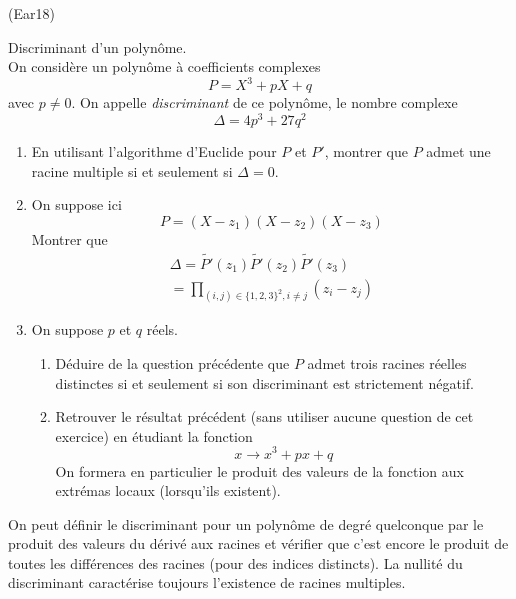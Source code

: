 \begin{tiny}(Ear18)\end{tiny} Discriminant d'un polynôme.\\
On considère un polynôme à coefficients complexes
\begin{displaymath}
 P = X^3 +pX+q
\end{displaymath}
avec $p\neq 0$. On appelle \emph{discriminant} de ce polynôme, le nombre complexe
\begin{displaymath}
 \Delta = 4p^3 + 27q^2
\end{displaymath}
\begin{enumerate}
 \item En utilisant l'algorithme d'Euclide pour $P$ et $P'$, montrer que $P$ admet une racine multiple si et seulement si $\Delta =0$.
 \item On suppose ici
\begin{displaymath}
 P = (X-z_1)(X-z_2)(X-z_3)
\end{displaymath}
 Montrer que
\begin{multline*}
 \Delta = \widetilde{P'}(z_1)\widetilde{P'}(z_2)\widetilde{P'}(z_3)\\
 = \prod_{(i,j)\in\{1,2,3\}^2,i\neq j} (z_i-z_j)
\end{multline*}
\item On suppose $p$ et $q$ réels.
\begin{enumerate}
 \item Déduire de la question précédente que $P$ admet trois racines réelles distinctes si et seulement si son discriminant est strictement négatif.
 \item Retrouver le résultat précédent (sans utiliser aucune question de cet exercice) en étudiant la fonction
\begin{displaymath}
 x\rightarrow x^3+px+q
\end{displaymath}
On formera en particulier le produit des valeurs de la fonction aux extrémas locaux (lorsqu'ils existent).
\end{enumerate}
\end{enumerate}
On peut définir le discriminant pour un polynôme de degré quelconque par le produit des valeurs du dérivé aux racines et vérifier que c'est encore le produit de toutes les différences des racines (pour des indices distincts). La nullité du discriminant caractérise toujours l'existence de racines multiples.
